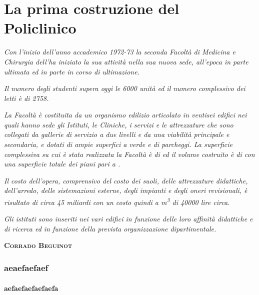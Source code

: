 \chapter{La prima costruzione del Policlinico}
\thispagestyle{empty}
\emph{Con l'inizio dell'anno accademico 1972-73 la seconda Facoltà di Medicina e Chirurgia dell'\uni ha iniziato la sua attività nella sua nuova sede, all'epoca in parte ultimata ed in parte in corso di ultimazione.}

\emph{Il numero degli studenti supera oggi le \num{6000} unità ed il numero complessivo dei letti è di \num{2758}.}

\emph{La Facoltà è costituita da un organismo edilizio articolato in ventisei edifici nei quali hanno sede gli Istituti, le Cliniche, i servizi e le attrezzature che sono collegati da gallerie di servizio a due livelli e da una viabilità principale e secondaria, e dotati di ampie superfici a verde e di parcheggi. La superficie complessiva su cui è stata realizzata la Facoltà è di  ed il volume costruito è di  con una superficie totale dei piani pari a .}

\emph{Il costo dell'opera, comprensivo del costo dei suoli, delle attrezzature didattiche, dell'arredo, delle sistemazioni esterne, degli impianti e degli oneri revisionali, è risultato di circa \num{45} miliardi con un costo quindi a \si{m^3} di \num{40000} lire circa.}

\emph{Gli istituti sono inseriti nei vari edifici in funzione delle loro affinità didattiche e di ricerca ed in funzione della prevista organizzazione dipartimentale.} 
\vspace{2em}
\begin{flushright}
	\textbf{\textsc{Corrado Beguinot}}
\end{flushright}
\newpage
\subsection{aeaefaefaef}
\subsubsection{aefaefaefaefaefa}
